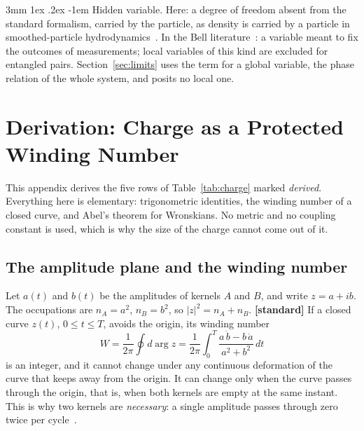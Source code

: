 \documentclass[%
 reprint, amsmath,amssymb, aps, prb, ]{revtex4-2}
\makeatletter
\numberwithin{equation}{section}
\renewcommand\paragraph{%
  \@startsection{paragraph}{4}{\z@}%
    {3mm \@plus 1ex \@minus .2ex}
    {-1em}
    {\normalfont\normalsize\itshape}}
\makeatother
\begin{document}
\paragraph{Hidden variable.} Here: a degree of freedom absent from the standard formalism, carried by the particle, as density is carried by a particle in smoothed-particle hydrodynamics~\cite{ref:monaghan}. In the Bell literature~\cite{ref:bell66}: a variable meant to fix the outcomes of measurements; local variables of this kind are excluded for entangled pairs. Section~\ref{sec:limits} uses the term for a global variable, the phase relation of the whole system, and posits no local one.

\section{Derivation: Charge as a Protected Winding Number}
\label{app:charge}

This appendix derives the five rows of Table~\ref{tab:charge} marked \emph{derived}. Everything here is elementary: trigonometric identities, the winding number of a closed curve, and Abel's theorem for Wronskians. No metric and no coupling constant is used, which is why the size of the charge cannot come out of it.

\subsection{The amplitude plane and the winding number}

Let $a(t)$ and $b(t)$ be the amplitudes of kernels $A$ and $B$, and write $z=a+ib$. The occupations are $n_A=a^2$, $n_B=b^2$, so $|z|^2=n_A+n_B$. \textbf{[standard]} If a closed curve $z(t)$, $0\le t\le T$, avoids the origin, its winding number~\cite{ref:hatcher}
\begin{equation}
W=\frac{1}{2\pi}\oint d\arg z=\frac{1}{2\pi}\int_0^T\frac{a\,\dot b-b\,\dot a}{a^2+b^2}\,dt
\label{eq:Wdef}
\end{equation}
is an integer, and it cannot change under any continuous deformation of the curve that keeps away from the origin. It can change only when the curve passes through the origin, that is, when both kernels are empty at the same instant. This is why two kernels are \emph{necessary}: a single amplitude passes through zero twice per cycle~\cite{ref:p1,ref:p20}.
\end{document}
